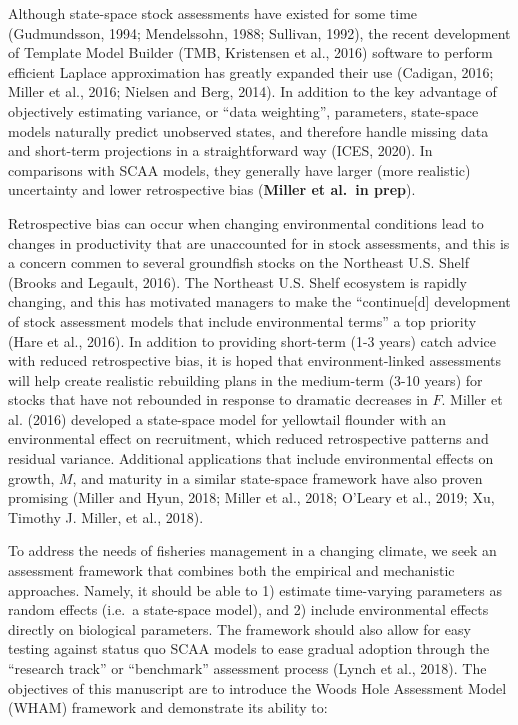 \documentclass[]{article}
\begin{document}
Although state-space stock assessments have existed for some time
(Gudmundsson, 1994; Mendelssohn, 1988; Sullivan, 1992), the recent
development of Template Model Builder (TMB, Kristensen et al., 2016)
software to perform efficient Laplace approximation has greatly expanded
their use (Cadigan, 2016; Miller et al., 2016; Nielsen and Berg, 2014).
In addition to the key advantage of objectively estimating variance, or
``data weighting'', parameters, state-space models naturally predict
unobserved states, and therefore handle missing data and short-term
projections in a straightforward way (ICES, 2020). In comparisons with
SCAA models, they generally have larger (more realistic) uncertainty and
lower retrospective bias (\textbf{Miller et al.~in prep}).

Retrospective bias can occur when changing environmental conditions lead
to changes in productivity that are unaccounted for in stock
assessments, and this is a concern commen to several groundfish stocks
on the Northeast U.S. Shelf (Brooks and Legault, 2016). The Northeast
U.S. Shelf ecosystem is rapidly changing, and this has motivated
managers to make the ``continue{[}d{]} development of stock assessment
models that include environmental terms'' a top priority (Hare et al.,
2016). In addition to providing short-term (1-3 years) catch advice with
reduced retrospective bias, it is hoped that environment-linked
assessments will help create realistic rebuilding plans in the
medium-term (3-10 years) for stocks that have not rebounded in response
to dramatic decreases in \(F\). Miller et al. (2016) developed a
state-space model for yellowtail flounder with an environmental effect
on recruitment, which reduced retrospective patterns and residual
variance. Additional applications that include environmental effects on
growth, \(M\), and maturity in a similar state-space framework have also
proven promising (Miller and Hyun, 2018; Miller et al., 2018; O'Leary et
al., 2019; Xu, Timothy J. Miller, et al., 2018).

To address the needs of fisheries management in a changing climate, we
seek an assessment framework that combines both the empirical and
mechanistic approaches. Namely, it should be able to 1) estimate
time-varying parameters as random effects (i.e.~a state-space model),
and 2) include environmental effects directly on biological parameters.
The framework should also allow for easy testing against status quo SCAA
models to ease gradual adoption through the ``research track'' or
``benchmark'' assessment process (Lynch et al., 2018). The objectives of
this manuscript are to introduce the Woods Hole Assessment Model (WHAM)
framework and demonstrate its ability to:
\end{document}
